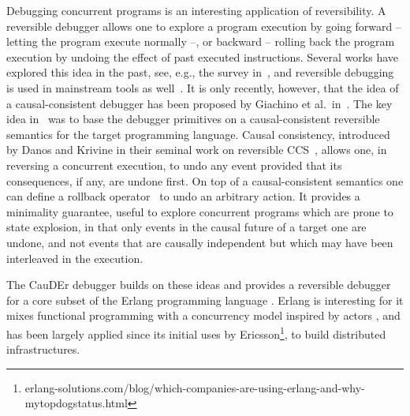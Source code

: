 \documentclass[runningheads]{llncs}
\begin{document}
Debugging concurrent programs is an interesting application of reversibility. 
A reversible debugger allows one to explore a program execution by going forward -- letting the program execute normally --,
or backward -- rolling back the program execution by undoing the effect of past executed instructions. 
Several works have explored this idea in the past, see, e.g., the survey in~\cite{Engblom12}, and reversible debugging is used in mainstream tools as well~\cite{microsoft}.
It is only recently, however, that the idea of a causal-consistent debugger has been proposed by Giachino et al.~in~\cite{GiachinoLM14}.
The key idea in~\cite{GiachinoLM14} was to base the debugger primitives on a causal-consistent reversible semantics for 
the target programming language. 
Causal consistency, introduced by Danos and Krivine in their seminal work on reversible CCS~\cite{DanosK04},
allows one, in reversing a concurrent execution, to undo any event provided that its consequences, if any, are undone first.
On top of a causal-consistent semantics one can define a rollback operator~\cite{LaneseMSS11} to undo an arbitrary action. It provides a minimality guarantee, useful to explore concurrent programs 
which are prone to state explosion, in that only events in the causal future of a target one are undone,
and not events that are causally independent but which may have been interleaved in the execution.

The CauDEr debugger \cite{LNPV18,Gonzalez-AbrilV21,Cauder} builds on these ideas and provides a reversible debugger for 
a core subset of the Erlang programming language
\cite{book:erlang}. Erlang is interesting for it mixes functional programming with a concurrency model
inspired by actors \cite{Agha86Book}, and has been largely applied since its initial uses by Ericsson\footnote{erlang-solutions.com/blog/which-companies-are-using-erlang-and-why-mytopdogstatus.html}, 
to build distributed infrastructures.
\end{document}
